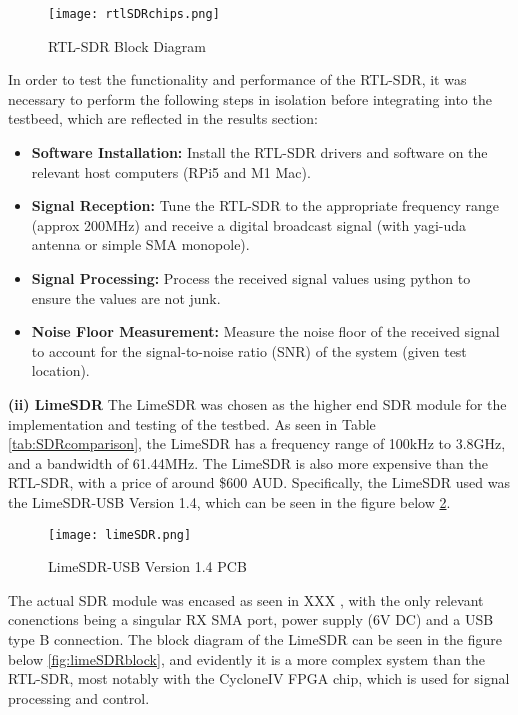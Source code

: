 \begin{figure}[htbp]
    \centering
    \texttt{[image: rtlSDRchips.png]}
    \caption{RTL-SDR Block Diagram \cite{RTLsdrBlockDiagram}}
    \label{fig:rtlSDRblock}
\end{figure}

\par \noindent

In order to test the functionality and performance of the RTL-SDR, it was necessary to perform the following steps in isolation before integrating into the testbeed, which are reflected in the results section:
\begin{itemize}
    \item \textbf{Software Installation:} Install the RTL-SDR drivers and software on the relevant host computers (RPi5 and M1 Mac).
    \item \textbf{Signal Reception:} Tune the RTL-SDR to the appropriate frequency range (approx 200MHz) and receive a digital broadcast signal (with yagi-uda antenna or simple SMA monopole).
    \item \textbf{Signal Processing:} Process the received signal values using python to ensure the values are not junk.
    \item \textbf{Noise Floor Measurement:} Measure the noise floor of the received signal to account for the signal-to-noise ratio (SNR) of the system (given test location).
\end{itemize}

\vspace{0.5cm} \noindent 
\textbf{(ii) LimeSDR}
The LimeSDR was chosen as the higher end SDR module for the implementation and testing of the testbed. As seen in Table \ref{tab:SDRcomparison}, the LimeSDR has a frequency range of 100kHz to 3.8GHz, and a bandwidth of 61.44MHz. The LimeSDR is also more expensive than the RTL-SDR, with a price of around \$600 AUD. Specifically, the LimeSDR used was the LimeSDR-USB Version 1.4, which can be seen in the figure below \ref{fig:limeSDR}. 

\begin{figure}[htbp]
    \centering
    \texttt{[image: limeSDR.png]}
    \caption{LimeSDR-USB Version 1.4 PCB \cite{limesdr_usb}}
    \label{fig:limeSDR}
\end{figure}

The actual SDR module was encased as seen in XXX , with the only relevant conenctions being a singular RX SMA port, power supply (6V DC) and a USB type B connection. The block diagram of the LimeSDR can be seen in the figure below \ref{fig:limeSDRblock}, and evidently it is a more complex system than the RTL-SDR, most notably with the CycloneIV FPGA chip, which is used for signal processing and control.

